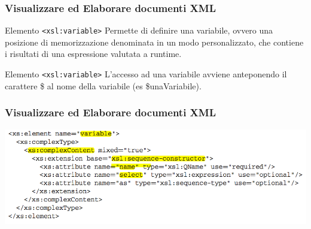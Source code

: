 
\begin{frame}
    \frametitle{Visualizzare ed Elaborare documenti XML}
    \addtocounter{nframe}{1}
    

     \begin{block}{Elemento \texttt{<xsl:variable>}}
        Permette di definire una variabile, ovvero una posizione di memorizzazione denominata in un modo personalizzato, che contiene i risultati di una espressione valutata a runtime.
     \end{block}

     \begin{block}{Elemento \texttt{<xsl:variable>}}
        L’accesso ad una variabile avviene anteponendo il carattere \$ al nome della variabile (es \$unaVariabile).
     \end{block}

\end{frame}

\begin{frame}
    \frametitle{Visualizzare ed Elaborare documenti XML}
    \addtocounter{nframe}{1}
    
    \begin{center}
        \includegraphics[width=.9\textwidth]{imgs/Schema-variable.png}
    \end{center}

\end{frame}

